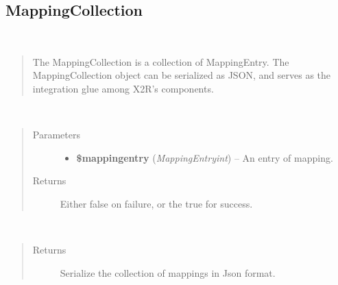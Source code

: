 \documentclass[letterpaper,10pt,english]{sphinxmanual}
\begin{document}
\subsection{MappingCollection}
\label{docs/api:mappingcollection}

\begin{fulllineitems}
\label{docs/api:MappingCollection}~\begin{quote}

The MappingCollection is a collection of MappingEntry. The MappingCollection object can be serialized as JSON, and serves as the integration glue among X2R's components.
\end{quote}

\begin{fulllineitems}
\label{docs/api:MappingCollection::addMappingEntry}~\begin{quote}\begin{description}
\item[{Parameters}] \leavevmode\begin{itemize}
\item {} 
\textbf{\$mappingentry} (\emph{MappingEntryint}) -- An entry of mapping.

\end{itemize}

\item[{Returns}] \leavevmode
Either false on failure, or the true for success.

\end{description}\end{quote}

\end{fulllineitems}


\begin{fulllineitems}
\label{docs/api:MappingCollection::toJson}~\begin{quote}\begin{description}
\item[{Returns}] \leavevmode
Serialize the collection of mappings in Json format.

\end{description}\end{quote}

\end{fulllineitems}


\end{fulllineitems}
\end{document}
